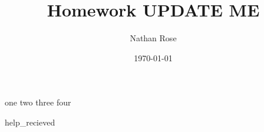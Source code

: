 \documentclass[11pt]{article}
\title{Homework UPDATE ME}
\author{Nathan Rose}
\date{\today}
\begin{document}
\maketitle
\begin{enumerate}
  {one}
  {two}
  {three}
  {four}
\end{enumerate}
{help_recieved}
\end{document}
